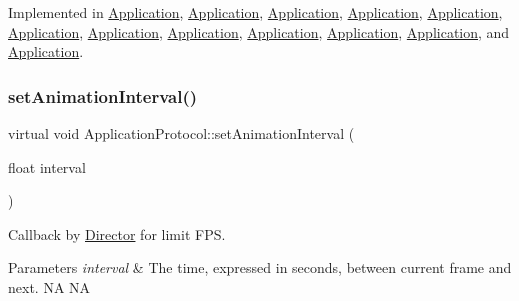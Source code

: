 Implemented in \hyperlink{classApplication_af04c472d3fac0d922d088896504925ac}{Application}, \hyperlink{classApplication_af04c472d3fac0d922d088896504925ac}{Application}, \hyperlink{classApplication_af04c472d3fac0d922d088896504925ac}{Application}, \hyperlink{classApplication_a1b5b44a0013466855dce330a517885c3}{Application}, \hyperlink{classApplication_a3160c4ee81ef7fba87d7299991998d5b}{Application}, \hyperlink{classApplication_a760516339314580f5086173d006483cc}{Application}, \hyperlink{classApplication_af04c472d3fac0d922d088896504925ac}{Application}, \hyperlink{classApplication_a3160c4ee81ef7fba87d7299991998d5b}{Application}, \hyperlink{classApplication_af04c472d3fac0d922d088896504925ac}{Application}, \hyperlink{classApplication_af04c472d3fac0d922d088896504925ac}{Application}, \hyperlink{classApplication_af04c472d3fac0d922d088896504925ac}{Application}, and \hyperlink{classApplication_a760516339314580f5086173d006483cc}{Application}.

\mbox{\label{classApplicationProtocol_ac69ac0f01aaba7cc8654ec7cce4eb88f}} 
\subsubsection{\texorpdfstring{set\+Animation\+Interval()}{setAnimationInterval()}\hspace{0.1cm}{\footnotesize\ttfamily [2/2]}}
{\footnotesize\ttfamily virtual void Application\+Protocol\+::set\+Animation\+Interval (\begin{DoxyParamCaption}\item[{float}]{interval }\end{DoxyParamCaption})\hspace{0.3cm}{\ttfamily [pure virtual]}}



Callback by \hyperlink{classDirector}{Director} for limit F\+PS. 


\begin{DoxyParams}{Parameters}
{\em interval} & The time, expressed in seconds, between current frame and next.  NA  NA \\
\hline
\end{DoxyParams}


